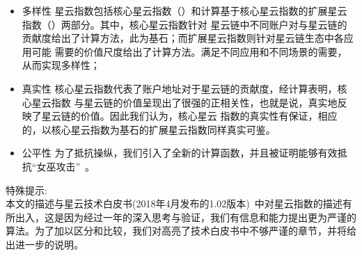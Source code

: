 \begin{itemize}
\item{多样性} 星云指数包括核心星云指数（\nrcore）和计算基于核心星云指数的扩展星云指数（\nrext）两部分。其中，核心星云指数针对
星云链中不同账户对与星云链的贡献度给出了计算方法，此为基石；而扩展星云指数则针对星云链生态中各应用可能
需要的价值尺度给出了计算方法。满足不同应用和不同场景的需要，从而实现多样性；
\item{真实性} 核心星云指数代表了账户地址对于星云链的贡献度，经计算表明，核心星云指数
与星云链的价值呈现出了很强的正相关性，也就是说，真实地反映了星云链的价值。因此我们认为，核心星云
指数的真实性有保证，相应的，以核心星云指数为基石的扩展星云指数同样真实可鉴。
\item{公平性} 为了抵抗操纵，我们引入了全新的计算函数，并且被证明能够有效抵抗“女巫攻击”~\cite{cheng2005sybilproof}。%
\end{itemize}

\noindent 特殊提示:\\
本文的描述与星云技术白皮书(2018年4月发布的1.02版本)~\cite{Nabulas}中对星云指数的描述有所出入，这是因为经过一年的深入思考与验证，我们有信息和能力提出更为严谨的算法。为了加以区分和比较，我们对高亮了技术白皮书中不够严谨的章节，并将给出进一步的说明。
